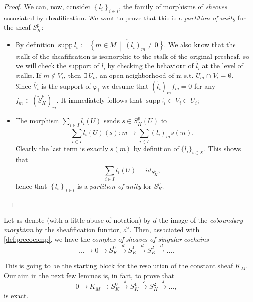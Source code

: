 \begin{proof}
	We can, now, consider $\left\{ l_i \right\}_{i \in i}$, the family of morphisms of \textit{sheaves} associated by sheafification.
	We want to prove that this is a \textit{partition of unity} for the sheaf $S^p_K$:
	\begin{itemize}
		\item By definition $\operatorname{\mathrm{supp}}l_i := \overline{\left\{ m \in M \ \middle|\ \left( l_i \right)_m \neq 0 \right\}}$.
			We also know that the stalk of the sheafification is isomorphic to the stalk of the original presheaf, so we will check the support of $l_i$ by checking the behaviour of $\widetilde{l}_i$ at the level of stalks.
			If $m \notin \overline{V}_i$, then $\exists\, U_m$ an open neighborhood of m s.t. $U_m \cap_{} \overline{V}_i = \emptyset$. 
			Since $\overline{V}_i$ is the support of $\varphi_i$ we desume that $(\widetilde{l}_i)_m f_m = 0$ for any $f_m \in ( \widetilde{S}^p_K )_m$.
			It immediately follows that $\operatorname{\mathrm{supp}}l_i \subset \overline{V}_i \subset U_i$;
		\item The morphism $\sum_{i \in I}^{} l_i (U)$ sends $s \in S^p_K(U)$ to
			\begin{equation}
				\sum_{i \in I}^{} l_i (U) (s): m \mapsto \sum_{i \in I}^{} (l_i)_m s(m)
			.\end{equation} 
			Clearly the last term is exactly $s(m)$ by definition of $\big\{ \widetilde{l}_i \big\}_{i \in X}$.
			This shows that
			\begin{equation}
				\sum_{i \in I}^{} l_i (U) = id_{S^p_K}
			,\end{equation} 
			hence that $\left\{ l_i \right\}_{i \in i}$ is a \textit{partition of unity} for  $S^p_K$.\qedhere
	\end{itemize} 
\end{proof}


\begin{defn}
	Let us denote (with a little abuse of notation) by $d$ the image of the \textit{coboundary morphism} by the sheafification functor, $d^a$.
	Then, associated with \ref{def:precocomp}, we have the \textit{complex of sheaves of singular cochains}
	\begin{equation}
		\ldots \to 0 \to S_K^0 \xrightarrow{d} S^1_K \xrightarrow{d} S^2_K \xrightarrow{d} \ldots
	.\end{equation} 
\end{defn}

\begin{rem}
	This is going to be the starting block for the resolution of the constant sheaf $K_M$.
	Our aim in the next few lemmas is, in fact, to prove that
	\begin{equation}\label{eqn:KMResolution}
		0 \to K_M \to S^0_K \xrightarrow{d} S^1_K \xrightarrow{d} S^2_K \xrightarrow{d} \ldots
	,\end{equation} 
	is exact.
\end{rem}


